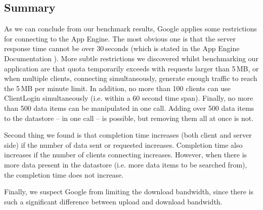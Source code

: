 \subsection{Summary}
As we can conclude from our benchmark results, Google applies some restrictions
for connecting to the App Engine. The most obvious one is that the
server response time cannot be over 30\,seconds (which is stated in the App
Engine Documentation \cite{app-engine-quotas}). More subtle restrictions we
discovered whilst benchmarking our application are that quota temporarily exceeds
with requests larger than 5\,MB, or when multiple clients, connecting
simultaneously, generate enough traffic to reach the 5\,MB per minute limit.
In addition, no more than 100 clients can use ClientLogin simultaneously (i.e.
within a 60 second time span). Finally, no more than 500 data items can be
manipulated in one call. Adding over 500 data items to the datastore -- in one
call -- is possible, but removing them all at once is not.

Second thing we found is that completion time increases (both client and server
side) if the number of data sent or requested increases. Completion time also
increases if the number of clients connecting increases. However, when there is
more data present in the datastore (i.e. more data items to be searched from),
the completion time does not increase.

Finally, we suspect Google from limiting the download bandwidth, since there is
such a significant difference between upload and download bandwidth.
